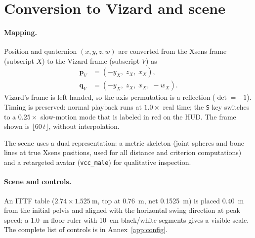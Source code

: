 \section{Conversion to Vizard and scene}\label{sec:conversion}

\paragraph{Mapping.} Position and quaternion $(x,y,z,w)$ are converted from the Xsens frame (subscript $X$) to the Vizard frame (subscript $V$) as
\begin{align}
    \mathbf{p}_V & = \left(-y_X,\; z_X,\; x_X\right), \label{eq:pos}          \\
    \mathbf{q}_V & = \left(-y_X,\; z_X,\; x_X,\; -w_X\right). \label{eq:quat}
\end{align}
Vizard's frame is left-handed, so the axis permutation is a reflection ($\det=-1$). Timing is preserved: normal playback runs at $1.0\times$ real time; the \texttt{S} key switches to a $0.25\times$ slow-motion mode that is labeled in red on the HUD. The frame shown is $\lfloor 60\,t\rfloor$, without interpolation.

The scene uses a dual representation: a metric skeleton (joint spheres and bone lines at true Xsens positions, used for all distance and criterion computations) and a retargeted avatar (\texttt{vcc\_male}) for qualitative inspection.

\paragraph{Scene and controls.} An ITTF table ($2.74\times\SI{1.525}{\meter}$, top at \SI{0.76}{\meter}, net \SI{0.1525}{\meter}) is placed \SI{0.40}{\meter} from the initial pelvis and aligned with the horizontal swing direction at peak speed; a \SI{1.0}{\meter} floor ruler with \SI{10}{\centi\meter} black/white segments gives a visible scale. The complete list of controls is in Annex~\ref{app:config}.
